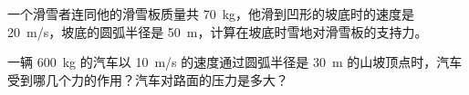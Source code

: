 \begin{Exercise}
\begin{question}


\item  一个滑雪者连同他的滑雪板质量共 \qty{70}{kg}，他滑到凹形的坡底时的速度是 \qty{20}{m/s}，坡底的圆弧半径是 \qty{50}{m}，计算在坡底时雪地对滑雪板的支持力。
\item  一辆 \qty{600}{kg} 的汽车以 \qty{10}{m/s} 的速度通过圆弧半径是 \qty{30}{m} 的山坡顶点时，汽车受到哪几个力的作用？汽车对路面的压力是多大？
\end{question}
\end{Exercise}